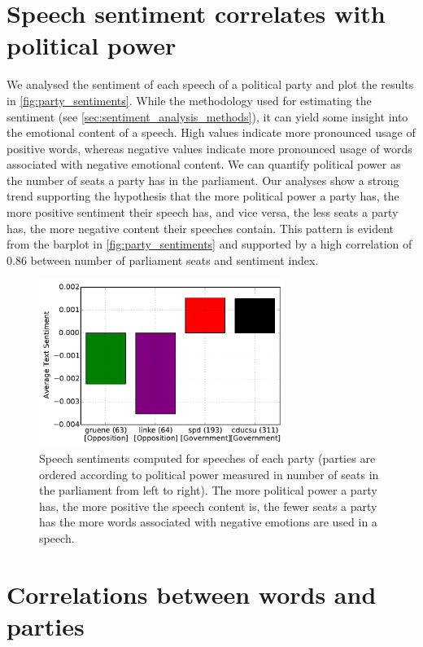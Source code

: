 \documentclass[runningheads,a4paper]{llncs}
\begin{document}
\section{Speech sentiment correlates with political power}\label{sec:sentiment_result}
We analysed the sentiment of each speech of a political party and plot the results in \autoref{fig:party_sentiments}. While the methodology used for estimating the sentiment (see \autoref{sec:sentiment_analysis_methods}), it can yield some insight into the emotional content of a speech. High values indicate more pronounced usage of positive words, whereas negative values indicate more pronounced usage of words associated with negative emotional content. We can quantify political power as the number of seats a party has in the parliament. Our analyses show a strong trend supporting the hypothesis that the more political power a party has, the more positive sentiment their speech has, and vice versa, the less seats a party has, the more negative content their speeches contain. This pattern is evident from the barplot in \autoref{fig:party_sentiments} and supported by a high correlation of 0.86 between number of parliament seats and sentiment index.

\begin{figure}
\begin{center}
\includegraphics[width=8cm]{images/party-sentiments-18.pdf} 
%
\end{center}
\caption{
\label{fig:party_sentiments}
Speech sentiments computed for speeches of each party (parties are ordered according to political power measured in number of seats in the parliament from left to right). The more political power a party has, the more positive the speech content is, the fewer seats a party has the more words associated with negative emotions are used in a speech. 
}
\end{figure}

\section{Correlations between words and parties}\label{sec:word_party_correlations}
\end{document}
